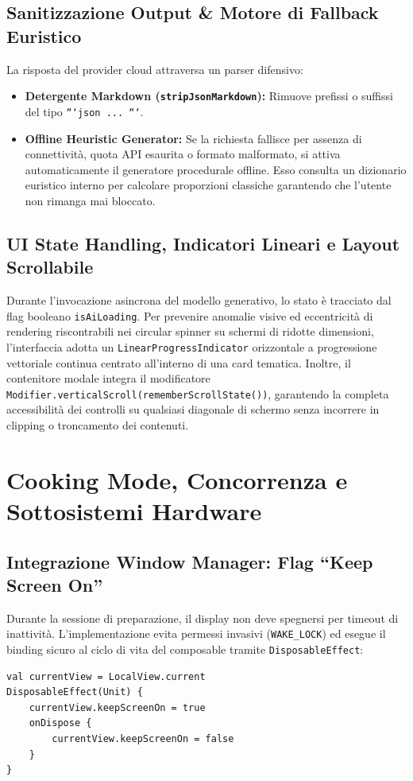 \documentclass[11pt,a4paper,titlepage]{article}
\begin{document}
\subsection{Sanitizzazione Output \& Motore di Fallback Euristico}
La risposta del provider cloud attraversa un parser difensivo:
\begin{itemize}[leftmargin=*]
    \item \textbf{Detergente Markdown (\texttt{stripJsonMarkdown}):} Rimuove prefissi o suffissi del tipo \texttt{```json ... ```}.
    \item \textbf{Offline Heuristic Generator:} Se la richiesta fallisce per assenza di connettivit\`a, quota API esaurita o formato malformato, si attiva automaticamente il generatore procedurale offline. Esso consulta un dizionario euristico interno per calcolare proporzioni classiche garantendo che l'utente non rimanga mai bloccato.
\end{itemize}

\subsection{UI State Handling, Indicatori Lineari e Layout Scrollabile}
Durante l'invocazione asincrona del modello generativo, lo stato \`e tracciato dal flag booleano \texttt{isAiLoading}. Per prevenire anomalie visive ed eccentricit\`a di rendering riscontrabili nei circular spinner su schermi di ridotte dimensioni, l'interfaccia adotta un \texttt{LinearProgressIndicator} orizzontale a progressione vettoriale continua centrato all'interno di una card tematica. Inoltre, il contenitore modale integra il modificatore \texttt{Modifier.verticalScroll(rememberScrollState())}, garantendo la completa accessibilit\`a dei controlli su qualsiasi diagonale di schermo senza incorrere in clipping o troncamento dei contenuti.

\section{Cooking Mode, Concorrenza e Sottosistemi Hardware}
\subsection{Integrazione Window Manager: Flag ``Keep Screen On''}
Durante la sessione di preparazione, il display non deve spegnersi per timeout di inattivit\`a. L'implementazione evita permessi invasivi (\texttt{WAKE\_LOCK}) ed esegue il binding sicuro al ciclo di vita del composable tramite \texttt{DisposableEffect}:
\begin{lstlisting}[caption={Binding dichiarativo del flag Keep-Screen-On in CookingModeScreen}]
val currentView = LocalView.current
DisposableEffect(Unit) {
    currentView.keepScreenOn = true
    onDispose {
        currentView.keepScreenOn = false
    }
}
\end{lstlisting}
\end{document}
